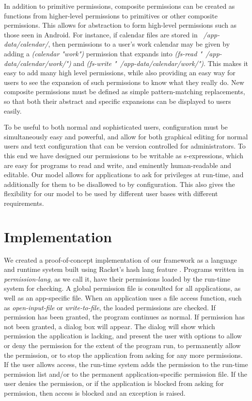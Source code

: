 In addition to primitive permissions, composite permissions can be created as functions from higher-level permissions to primitives or other composite permissions.  This allows for abstraction to form high-level permissions such as those seen in Android.  For instance, if calendar files are stored in \textit{~/app-data/calendar/}, then permissions to a user's work calendar may be given by adding a \textit{(calendar "work")} permission that expands into \textit{(fs-read "~/app-data/calendar/work/")} and \textit{(fs-write "~/app-data/calendar/work/")}.  This makes it easy to add many high level permissions, while also providing an easy way for users to see the expansion of such permissions to know what they really do.  New composite permissions must be defined as simple pattern-matching replacements, so that both their abstract and specific expansions can be displayed to users easily.

To be useful to both normal and sophisticated users, configuration must be simultaneously easy and powerful, and allow for both graphical editing for normal users and text configuration that can be version controlled for administrators.
To this end we have designed our permissions to be writable as s-expressions, which are easy for programs to read and write, and eminently human-readable and editable.
Our model allows for applications to ask for privileges at run-time, and additionally for them to be disallowed to by configuration.  This also gives the flexibility for our model to be used by different user bases with different requirements.

\section{Implementation}\label{section:implementation}
We created a proof-of-concept implementation of our framework as a language and runtime system built using Racket's hash lang feature \cite{rakt}. Programs written in \textit{permission-lang}, as we call it, have their permissions loaded by the run-time system for checking.
A global permission file is consulted for all applications, as well as an app-specific file.  
When an application uses a file access function, such as \textit{open-input-file} or \textit{write-to-file}, the loaded permissions are checked.  
If permission has been granted, the program continues as normal.  
If permission has not been granted, a dialog box will appear.  
The dialog will show which permission the application is lacking, and present the user with options to allow or deny the permission for the extent of the program run, to permanently allow the permission, or to stop the application from asking for any more permissions.
If the user allows access, the run-time system adds the permission to the run-time permission list and/or to the permanent application-specific permission file.
If the user denies the permission, or if the application is blocked from asking for permission, then access is blocked and an exception is raised.
\\

